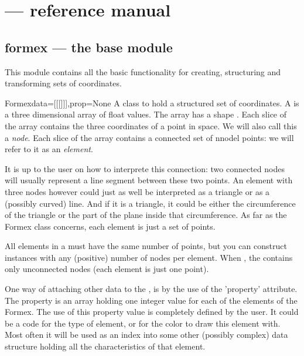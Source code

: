 
\chapter{\pyformex --- reference manual}
{\label{cha:reference}

\section{formex --- the base module}
{\label{sec:formex}

This module contains all the basic functionality for creating, structuring and transforming sets of coordinates.

\begin{classdesc}  {Formex}{data=[[[]]],prop=None}
A class to hold a structured set of coordinates. A  is a three dimensional array of float values. The array has a shape . Each slice \code{[i,j]} of the array contains the three coordinates of a point in space. We will also call this a \emph{node}. Each slice \code{[i]} of the array contains a connected set of nnodel points: we will refer to it as an \emph{element}. 

It is up to the user on how to interprete this connection: two connected nodes will usually represent a line segment between these two points. An element with three nodes however could just as well be interpreted as a triangle or as a (possibly curved) line. And if it is a triangle, it could be either the circumference of the triangle or the part of the plane inside that circumference. As far as the Formex class concerns, each element is just a set of points. 

All elements in a  must have the same number of points, but you can construct  instances with any (positive) number of nodes per element. When , the  contains only unconnected nodes (each element is just one point).

One way of attaching other data to the , is by the use of the 'property' attribute. The property is an array holding one integer value for each of the elements of the Formex. The use of this property value is completely defined by the user. It could be a code for the type of element, or for the color to draw this element with. Most often it will be used as an index into some other (possibly complex) data structure holding all the characteristics of that element. 


\end{classdesc}}}
